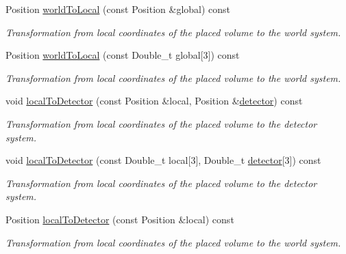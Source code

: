 \begin{DoxyCompactItemize}
Position \hyperlink{class_d_d4hep_1_1_alignments_1_1_alignment_data_af0dad9165c3564024d6f61cd54209efd}{worldToLocal} (const Position \&global) const 
\begin{DoxyCompactList}\small\item\em Transformation from local coordinates of the placed volume to the world system. \item\end{DoxyCompactList}\item 
Position \hyperlink{class_d_d4hep_1_1_alignments_1_1_alignment_data_af1900a9bf83d09f6719fa698d9db4f52}{worldToLocal} (const Double\_\-t global\mbox{[}3\mbox{]}) const 
\begin{DoxyCompactList}\small\item\em Transformation from local coordinates of the placed volume to the world system. \item\end{DoxyCompactList}\item 
void \hyperlink{class_d_d4hep_1_1_alignments_1_1_alignment_data_a21619d7d8890ce83f5275eb3351bf141}{localToDetector} (const Position \&local, Position \&\hyperlink{class_d_d4hep_1_1_alignments_1_1_alignment_data_abf7096d1f2d3ed307c361f2d6d03710e}{detector}) const 
\begin{DoxyCompactList}\small\item\em Transformation from local coordinates of the placed volume to the detector system. \item\end{DoxyCompactList}\item 
void \hyperlink{class_d_d4hep_1_1_alignments_1_1_alignment_data_a12bb4ad691f7ae0585b177291916cfde}{localToDetector} (const Double\_\-t local\mbox{[}3\mbox{]}, Double\_\-t \hyperlink{class_d_d4hep_1_1_alignments_1_1_alignment_data_abf7096d1f2d3ed307c361f2d6d03710e}{detector}\mbox{[}3\mbox{]}) const 
\begin{DoxyCompactList}\small\item\em Transformation from local coordinates of the placed volume to the detector system. \item\end{DoxyCompactList}\item 
Position \hyperlink{class_d_d4hep_1_1_alignments_1_1_alignment_data_a62df459217b36f04ddcae69e63cabdc2}{localToDetector} (const Position \&local) const 
\begin{DoxyCompactList}\small\item\em Transformation from local coordinates of the placed volume to the world system. \item\end{DoxyCompactList}\item 

\end{DoxyCompactItemize}
